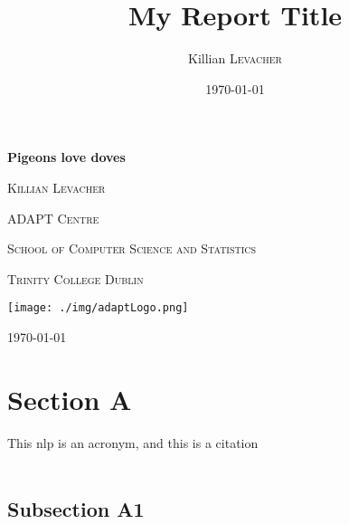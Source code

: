 \documentclass{article}
\title{My Report Title} %
\author{Killian \textsc{Levacher}} %
\date{\today} %
\begin{document}
\begin{titlepage}

	\centering


	{\Huge\bfseries Pigeons love doves\par}


\vspace{9cm}
	{\scshape\huge Killian Levacher\par}
		\vspace{1cm}
	{\scshape\Large ADAPT Centre\par}
	{\scshape\Large School of Computer Science and Statistics\par}
	{\scshape\Large Trinity College Dublin\par}
	

	\vfill


	\vfill
	\texttt{[image: ./img/adaptLogo.png]}\par\vspace{1cm}
	
	\vfill
	{\Large \today\par}
\end{titlepage}





\newpage

\section{Section A}
\label{sectionLabel}

This \gls{nlp} is an acronym, and this \cite{Derczynski2015} is a citation \\ \\
\lipsum[1-2] 

\subsection{Subsection A1}
\lipsum[1-1] 
\end{document}
